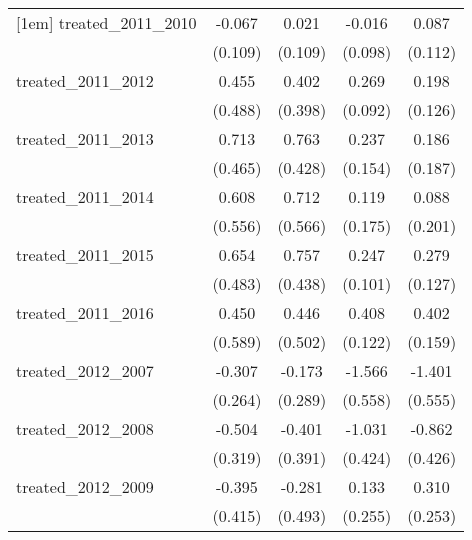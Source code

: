 {\begin{tabular}{l*{4}{c}}
[1em]
treated\_2011\_2010&      -0.067         &       0.021         &      -0.016         &       0.087         \\
            &     (0.109)         &     (0.109)         &     (0.098)         &     (0.112)         \\
[1em]
treated\_2011\_2012&       0.455         &       0.402         &       0.269\sym{**} &       0.198         \\
            &     (0.488)         &     (0.398)         &     (0.092)         &     (0.126)         \\
[1em]
treated\_2011\_2013&       0.713         &       0.763         &       0.237         &       0.186         \\
            &     (0.465)         &     (0.428)         &     (0.154)         &     (0.187)         \\
[1em]
treated\_2011\_2014&       0.608         &       0.712         &       0.119         &       0.088         \\
            &     (0.556)         &     (0.566)         &     (0.175)         &     (0.201)         \\
[1em]
treated\_2011\_2015&       0.654         &       0.757         &       0.247\sym{*}  &       0.279\sym{*}  \\
            &     (0.483)         &     (0.438)         &     (0.101)         &     (0.127)         \\
[1em]
treated\_2011\_2016&       0.450         &       0.446         &       0.408\sym{***}&       0.402\sym{*}  \\
            &     (0.589)         &     (0.502)         &     (0.122)         &     (0.159)         \\
[1em]
treated\_2012\_2007&      -0.307         &      -0.173         &      -1.566\sym{**} &      -1.401\sym{*}  \\
            &     (0.264)         &     (0.289)         &     (0.558)         &     (0.555)         \\
[1em]
treated\_2012\_2008&      -0.504         &      -0.401         &      -1.031\sym{*}  &      -0.862\sym{*}  \\
            &     (0.319)         &     (0.391)         &     (0.424)         &     (0.426)         \\
[1em]
treated\_2012\_2009&      -0.395         &      -0.281         &       0.133         &       0.310         \\
            &     (0.415)         &     (0.493)         &     (0.255)         &     (0.253)         \\

\end{tabular}}
